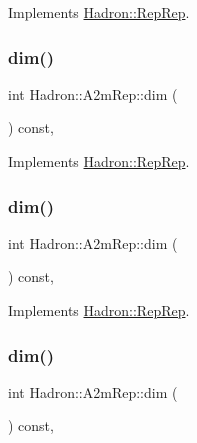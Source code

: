 Implements \mbox{\hyperlink{structHadron_1_1RepRep_a92c8802e5ed7afd7da43ccfd5b7cd92b}{Hadron\+::\+Rep\+Rep}}.

\mbox{\label{structHadron_1_1A2mRep_afa793882b0e3f47c922a65b8a17750a3}} 
\subsubsection{\texorpdfstring{dim()}{dim()}\hspace{0.1cm}{\footnotesize\ttfamily [3/5]}}
{\footnotesize\ttfamily int Hadron\+::\+A2m\+Rep\+::dim (\begin{DoxyParamCaption}{ }\end{DoxyParamCaption}) const\hspace{0.3cm}{\ttfamily [inline]}, {\ttfamily [virtual]}}



Implements \mbox{\hyperlink{structHadron_1_1RepRep_a92c8802e5ed7afd7da43ccfd5b7cd92b}{Hadron\+::\+Rep\+Rep}}.

\mbox{\label{structHadron_1_1A2mRep_afa793882b0e3f47c922a65b8a17750a3}} 
\subsubsection{\texorpdfstring{dim()}{dim()}\hspace{0.1cm}{\footnotesize\ttfamily [4/5]}}
{\footnotesize\ttfamily int Hadron\+::\+A2m\+Rep\+::dim (\begin{DoxyParamCaption}{ }\end{DoxyParamCaption}) const\hspace{0.3cm}{\ttfamily [inline]}, {\ttfamily [virtual]}}



Implements \mbox{\hyperlink{structHadron_1_1RepRep_a92c8802e5ed7afd7da43ccfd5b7cd92b}{Hadron\+::\+Rep\+Rep}}.

\mbox{\label{structHadron_1_1A2mRep_afa793882b0e3f47c922a65b8a17750a3}} 
\subsubsection{\texorpdfstring{dim()}{dim()}\hspace{0.1cm}{\footnotesize\ttfamily [5/5]}}
{\footnotesize\ttfamily int Hadron\+::\+A2m\+Rep\+::dim (\begin{DoxyParamCaption}{ }\end{DoxyParamCaption}) const\hspace{0.3cm}{\ttfamily [inline]}, {\ttfamily [virtual]}}



